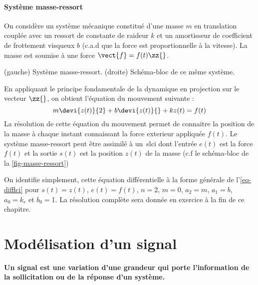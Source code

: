 \paragraph{Système masse-ressort\label{para-masse_ressort}}
On considère un système mécanique constitué d'une masse $m$ en translation 
couplée avec un ressort de constante
de raideur $k$ et un amortisseur de coefficient de frottement 
visqueux $b$ (c.a.d que la force est 
proportionnelle à la vitesse). 
La masse est soumise à une force $\vect{f}=f(t)\zz{}$.
\begin{marginfigure}[-8em]
    \centering
    
    \caption{(gauche) Système masse-ressort. (droite) Schéma-bloc de ce même 
    système.
    \label{fig-masse-ressort}}
\end{marginfigure}
En appliquant le principe fondamentale de la dynamique en projection 
sur le vecteur $\zz{}$, on obtient l'équation du mouvement suivante :
\[
m\devi{z(t)}{2}+b\devi{z(t)}{}+kz(t)=f(t)
\]
\newpage
\restoregeometry
\captionsetup{width=0.9\linewidth,labelfont=bf}
La résolution de cette équation du mouvement permet de connaitre la position 
de la masse à chaque instant connaissant la force exterieur 
appliquée $f(t)$. Le système masse-ressort peut être assimilé à un~\gls{slci} 
dont l'entrée $e(t)$ est la force $f(t)$ et la sortie $s(t)$ est la 
position $z(t)$ de la masse (c.f le schéma-bloc de la \cref{fig-masse-ressort})

On identifie simplement, cette équation différentielle à la forme générale 
de l'\cref{eq-difflci} pour $s(t)=z(t)$, $e(t)=f(t)$, 
$n=$2, $m=0$, $a_2=m$, $a_1=b$, $a_0=k_r$ et $b_0=$1.
La résolution complète sera donnée en exercice à la fin de ce chapitre.
\section{Modélisation d'un signal}
\textbf{Un signal est une variation d'une grandeur qui porte l'information 
de la sollicitation ou de la réponse d'un système.}

